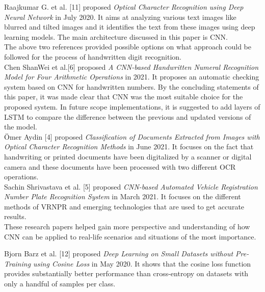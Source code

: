 \noindent
Raajkumar G. et al. [11] proposed {\it Optical Character Recognition using Deep Neural Network} in July 2020. 
\noindent
It aims at analyzing various text images like blurred and tilted images and it identifies the text from these images using deep learning models. The main architecture discussed in this paper is CNN.\\

\noindent
The above two references provided possible options on what approach could be followed for the process of handwritten digit recognition.\\

\noindent
Chen ShanWei et al.[6] proposed {\it A CNN-based Handwritten Numeral Recognition Model for Four Arithmetic Operations} in 2021. It proposes an automatic checking system based on CNN for handwritten numbers. By the concluding statements of this paper, it was made clear that CNN was the most suitable choice for the proposed system. In future scope implementations, it is suggested to add layers of LSTM to compare the difference between the previous and updated versions of the model. \\

\noindent
Ömer Aydin [4] proposed {\it Classification of Documents Extracted from Images with Optical Character Recognition Methods} in June 2021. 
\noindent
It focuses on the fact that handwriting or printed documents have been digitalized by a scanner or digital camera and these documents have been processed with two different OCR operations. \\

\noindent
Sachin Shrivastava et al. [5] proposed {\it CNN-based Automated Vehicle Registration Number Plate Recognition System} in March 2021.
\noindent
It focuses on the different methods of VRNPR and emerging technologies that are used to get accurate results. \\

\noindent
These research papers helped gain more perspective and understanding of how CNN can be applied to real-life scenarios and situations of the most importance.

\clearpage

\noindent
Bjorn Barz et al. [12] proposed {\it Deep Learning on Small Datasets without Pre-Training using Cosine Loss} in May 2020. 
\noindent
It shows that the cosine loss function provides substantially better performance than cross-entropy on datasets with only a handful of samples per class. \\

